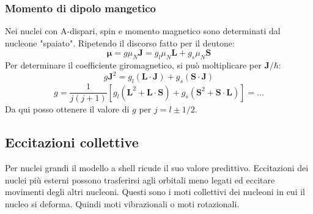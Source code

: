 \subsubsection{Momento di dipolo mangetico}
Nei nuclei con A-dispari, spin e momento magnetico sono determinati dal nucleone "spaiato". Ripetendo il discorso fatto per il deutone:
\begin{equation*}
    \bm{\mu}=g\mu_N\mathbf{J}=g_l\mu_N\mathbf{L}+g_s\mu_N\mathbf{S}
\end{equation*}
Per determinare il coefficiente giromagnetico, si può moltiplicare per $\mathbf{J}/\hbar$:
\begin{equation*}
    g\mathbf{J}^2=g_l\left(\mathbf{L}\cdot\mathbf{J}\right)+g_s\left(\mathbf{S}\cdot\mathbf{J}\right)
\end{equation*}
\begin{equation*}
    g=\frac{1}{j(j+1)}\left[g_l\left(\mathbf{L}^2+\mathbf{L}\cdot\mathbf{S}\right)+g_s\left(\mathbf{S}^2+\mathbf{S}\cdot\mathbf{L}\right)\right]=\ldots
\end{equation*}
Da qui posso ottenere il valore di $g$ per $j=l\pm1/2$.
\subsection{Eccitazioni collettive}
Per nuclei grandi il modello a shell ricude il suo valore predittivo. Eccitazioni dei nuclei più esterni possono trasferirsi agli orbitali meno legati ed eccitare movimenti degli altri nucleoni. Questi sono i moti collettivi dei nucleoni in cui il nucleo si deforma. Quindi moti vibrazionali o moti rotazionali.
